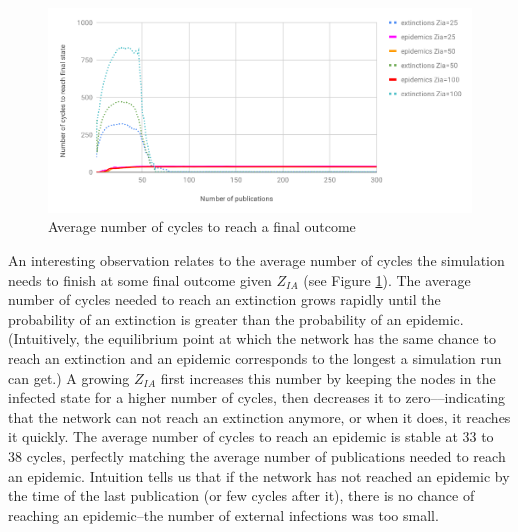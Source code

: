 \begin{figure}[h!]
    \includegraphics[width=\textwidth]{img/average-number-of-cycles-to-reach-final-state.png}
    \centering
    \caption{Average number of cycles to reach a final outcome}
    \label{fig:average-number-of-cycles}
\end{figure}
An interesting observation relates to the average number of cycles the simulation needs to finish at some final outcome given $Z_{IA}$ (see Figure \ref{fig:average-number-of-cycles}). The average number of cycles needed to reach an extinction grows rapidly until the probability of an extinction is greater than the probability of an epidemic. (Intuitively, the equilibrium point at which the network has the same chance to reach an extinction and an epidemic corresponds to the longest a simulation run can get.) A growing $Z_{IA}$ first increases this number by keeping the nodes in the infected state for a higher number of cycles, then decreases it to zero––indicating that the network can not reach an extinction anymore, or when it does, it reaches it quickly.
The average number of cycles to reach an epidemic is stable at 33 to 38 cycles, perfectly matching the average number of publications needed to reach an epidemic. Intuition tells us that if the network has not reached an epidemic by the time of the last publication (or few cycles after it), there is no chance of reaching an epidemic--the number of external infections was too small.


